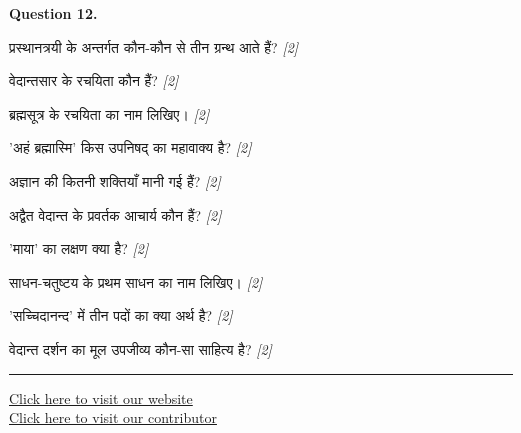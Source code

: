 \documentclass[11pt,a4paper]{article}
\newcommand{\pts}[1]{\hfill \textit{[#1]}}
\begin{document}
\bigskip

\noindent \textbf{Question 12.}
\begin{parts}
  \item प्रस्थानत्रयी के अन्तर्गत कौन-कौन से तीन ग्रन्थ आते हैं? \pts{2}
  \item वेदान्तसार के रचयिता कौन हैं? \pts{2}
  \item ब्रह्मसूत्र के रचयिता का नाम लिखिए। \pts{2}
  \item 'अहं ब्रह्मास्मि' किस उपनिषद् का महावाक्य है? \pts{2}
  \item अज्ञान की कितनी शक्तियाँ मानी गई हैं? \pts{2}
  \item अद्वैत वेदान्त के प्रवर्तक आचार्य कौन हैं? \pts{2}
  \item 'माया' का लक्षण क्या है? \pts{2}
  \item साधन-चतुष्टय के प्रथम साधन का नाम लिखिए। \pts{2}
  \item 'सच्चिदानन्द' में तीन पदों का क्या अर्थ है? \pts{2}
  \item वेदान्त दर्शन का मूल उपजीव्य कौन-सा साहित्य है? \pts{2}
\end{parts}

\vfill
\rule{\linewidth}{0.4pt}

\begin{center}\small
\href{https://bhu-exam.vercel.app/}{Click here to visit our website}\\[4pt]
\href{https://me-aryan.vercel.app/}{Click here to visit our contributor}
\end{center}
\end{document}
